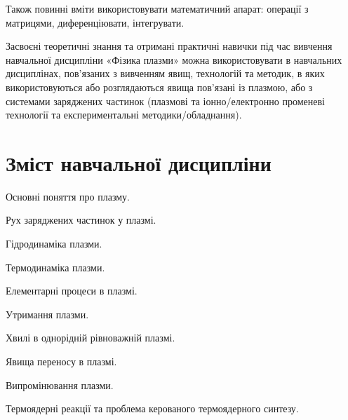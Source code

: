 \documentclass{Syllabus}
\begin{document}
Також повинні вміти використовувати математичний апарат: операції з матрицями,  диференціювати, інтегрувати.

Засвоєні теоретичні знання та отримані практичні навички під час вивчення навчальної дисципліни «Фізика плазми» можна використовувати в навчальних дисциплінах, пов’язаних з вивченням явищ, технологій та методик, в яких використовуються або розглядаються явища пов’язані із плазмою, або з системами заряджених частинок (плазмові та іонно/електронно променеві технології та експериментальні методики/обладнання).


\section{Зміст навчальної дисципліни}


\begin{Rozdil}
	\item Основні поняття про плазму.
    \item Рух заряджених частинок у плазмі.
    \item Гідродинаміка плазми.
	\item Термодинаміка плазми.
    \item Елементарні процеси в плазмі.
	\item Утримання плазми.
	\item Хвилі в однорідній рівноважній плазмі.
    \item Явища переносу в плазмі.
    \item Випромінювання плазми.
    \item Термоядерні реакції та проблема керованого термоядерного синтезу.
\end{Rozdil}

%
\end{document}
